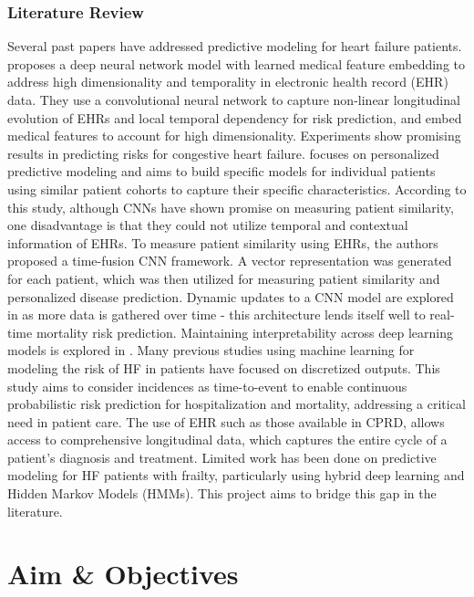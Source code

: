 \documentclass[%
 reprint,
 amsmath,amssymb,
 aps,
 nofootinbib,
]{revtex4-2}
\theoremstyle{definition}
\begin{document}
\subsubsection{\label{pastwork}Literature Review}
Several past papers have addressed predictive modeling for heart failure patients. \citep{che2017} proposes a deep neural network model with learned medical feature embedding to address high dimensionality and temporality in electronic health record (EHR) data. They use a convolutional neural network to capture non-linear longitudinal evolution of EHRs and local temporal dependency for risk prediction, and embed medical features to account for high dimensionality. Experiments show promising results in predicting risks for congestive heart failure. \citep{suo2017personalized} focuses on personalized predictive modeling and aims to build specific models for individual patients using similar patient cohorts to capture their specific characteristics. According to this study, although CNNs have shown promise on measuring patient similarity, one disadvantage is that they could not utilize temporal and contextual information of EHRs. To measure patient similarity using EHRs, the authors proposed a time-fusion CNN framework. A vector representation was generated for each patient, which was then utilized for measuring patient similarity and personalized disease prediction. Dynamic updates to a CNN model are explored in \citep{brand2018real} as more data is gathered over time - this architecture lends itself well to real-time mortality risk prediction. Maintaining interpretability across deep learning models is explored in \citep{caicedo2019iseeu}. Many previous studies using machine learning for modeling the risk of HF in patients have focused on discretized outputs. This study aims to consider incidences as time-to-event to enable continuous probabilistic risk prediction for hospitalization and mortality, addressing a critical need in patient care. The use of EHR such as those available in CPRD, allows access to comprehensive longitudinal data, which captures the entire cycle of a patient's diagnosis and treatment. Limited work has been done on predictive modeling for HF patients with frailty, particularly using hybrid deep learning and Hidden Markov Models (HMMs). This project aims to bridge this gap in the literature.

\section{\label{aimsobj}Aim \& Objectives}
\end{document}
